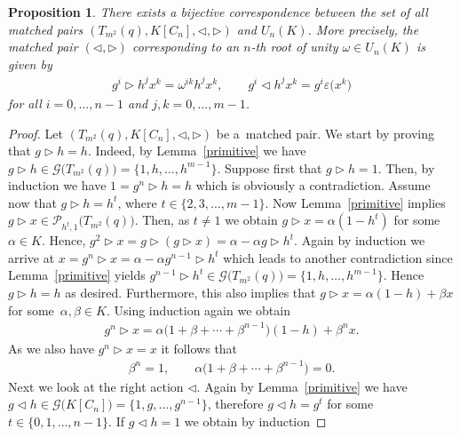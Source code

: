 \documentclass[10pt,a4paper]{amsart}
\numberwithin{equation}{section}
\newtheorem{Proposition}[Theorem]{Proposition}
 { \theoremstyle{definition}
\newtheorem{Example}[Theorem]{Example}
\newtheorem{Remark}[Theorem]{Remark} }
\begin{document}
\begin{Proposition} \label{mapex1}
There exists a bijective correspondence between the set of all matched pairs $(T_{m^{2}}(q), K[C_n], \triangleleft, \triangleright)$ and $U_n (K)$. More precisely, the matched pair $(\triangleleft, \triangleright)$ corresponding to an $n$-th root of unity $\omega \in U_n (K)$ is given by
\begin{gather}\label{mp}
g^{i} \triangleright h^{j} x^{k} = \omega^{ik} h^{j} x^{k}, \qquad g^{i} \triangleleft h^{j} x^{k} = g^{i} \varepsilon\big(x^{k}\big)
\end{gather}
for all $i = 0,\dots, n-1$ and $j, k = 0,\dots, m-1$.
\end{Proposition}

\begin{proof} Let $(T_{m^{2}}(q), K[C_n], \triangleleft, \triangleright)$ be a~matched pair. We start by proving that $g \triangleright h = h$.
Indeed, by Lemma~\ref{primitive} we have $g \triangleright h \in \mathcal{G}\big(T_{m^{2}}(q)\big) = \{1, h,\dots,h^{m-1}\}$. Suppose first that $g \triangleright h = 1$. Then, by induction we have $1 = g^{n} \triangleright h = h$ which is obviously a contradiction. Assume now that $g \triangleright h = h^{t}$, where $t \in \{2, 3,\dots, m-1\}$. Now Lemma~\ref{primitive} implies $g \triangleright x \in \mathcal{P}_{h^{t}, 1}\big(T_{m^{2}}(q)\big)$. Then, as $t \neq 1$ we obtain $g \triangleright x = \alpha(1-h^{t})$ for some $\alpha \in K$. Hence, $g^{2} \triangleright x = g \triangleright (g \triangleright x) = \alpha - \alpha g \triangleright h^{t}$. Again by induction we arrive at $x = g^{n} \triangleright x = \alpha - \alpha g^{n-1} \triangleright h^{t}$ which leads to another contradiction since Lemma~\ref{primitive} yields $g^{n-1} \triangleright h^{t} \in \mathcal{G}\big(T_{m^{2}}(q)\big) = \{1, h,\dots,h^{m-1}\}$. Hence $g \triangleright h = h$ as desired. Furthermore, this
also implies that $g \triangleright x = \alpha(1-h)+ \beta x$ for some~$\alpha, \beta \in K$. Using induction again we obtain
\begin{gather*}
g^{n} \triangleright x = \alpha\big(1 + \beta + \cdots + \beta^{n-1}\big) (1-h) + \beta^{n} x.
\end{gather*}
As we also have $g^{n} \triangleright x = x$ it follows that
\begin{gather*}
\beta^{n} = 1, \qquad \alpha\big(1 + \beta + \cdots + \beta^{n-1}\big)=0.
\end{gather*}
Next we look at the right action $\triangleleft$. Again by Lemma~\ref{primitive} we have $g \triangleleft h \in \mathcal{G}\big(K[C_n]\big) = \{1, g,\dots, g^{n-1}\}$, therefore $g \triangleleft h = g^{t}$ for some $t \in \{0,1, \dots, n-1\}$. If $g \triangleleft h = 1$ we obtain by induction

\end{proof}
\end{document}
